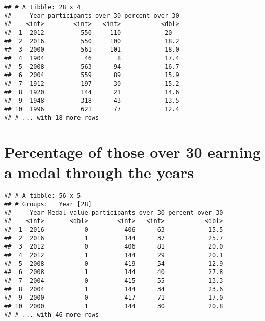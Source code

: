 \documentclass[]{article}
\newenvironment{Shaded}{\begin{snugshade}}{\end{snugshade}}
\newcommand{\KeywordTok}[1]{\textcolor[rgb]{0.13,0.29,0.53}{\textbf{#1}}}
\newcommand{\DataTypeTok}[1]{\textcolor[rgb]{0.13,0.29,0.53}{#1}}
\newcommand{\DecValTok}[1]{\textcolor[rgb]{0.00,0.00,0.81}{#1}}
\newcommand{\StringTok}[1]{\textcolor[rgb]{0.31,0.60,0.02}{#1}}
\newcommand{\OperatorTok}[1]{\textcolor[rgb]{0.81,0.36,0.00}{\textbf{#1}}}
\newcommand{\NormalTok}[1]{#1}
\begin{document}
\begin{verbatim}
## # A tibble: 28 x 4
##     Year participants over_30 percent_over_30
##    <int>        <int>   <int>           <dbl>
##  1  2012          550     110            20  
##  2  2016          550     100            18.2
##  3  2000          561     101            18.0
##  4  1904           46       8            17.4
##  5  2008          563      94            16.7
##  6  2004          559      89            15.9
##  7  1912          197      30            15.2
##  8  1920          144      21            14.6
##  9  1948          318      43            13.5
## 10  1996          621      77            12.4
## # ... with 18 more rows
\end{verbatim}

\section{Percentage of those over 30 earning a medal through the
years}\label{percentage-of-those-over-30-earning-a-medal-through-the-years}

\begin{Shaded}
\end{Shaded}

\begin{verbatim}
## # A tibble: 56 x 5
## # Groups:   Year [28]
##     Year Medal_value participants over_30 percent_over_30
##    <int>       <dbl>        <int>   <int>           <dbl>
##  1  2016           0          406      63            15.5
##  2  2016           1          144      37            25.7
##  3  2012           0          406      81            20.0
##  4  2012           1          144      29            20.1
##  5  2008           0          419      54            12.9
##  6  2008           1          144      40            27.8
##  7  2004           0          415      55            13.3
##  8  2004           1          144      34            23.6
##  9  2000           0          417      71            17.0
## 10  2000           1          144      30            20.8
## # ... with 46 more rows
\end{verbatim}
\end{document}
